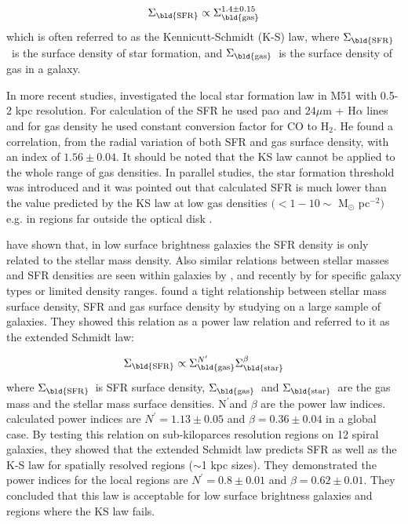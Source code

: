 \documentclass[useAMS,usenatbib]{mn2e}
\newcommand \sigmagas    {$\Sigma_{\rm \bld {gas }}$\ }
\newcommand \eqsigmagas    {\Sigma_{\rm \bld {gas }}}
\newcommand \sigmasfr     {$\Sigma_{\rm \bld {SFR }}$\ }
\newcommand \eqsigmasfr     {\Sigma_{\rm \bld {SFR }}}
\newcommand \sigmastar    {$\Sigma_{\rm \bld {star }}$\ }
\newcommand \eqsigmastar    {\Sigma_{\rm \bld {star }}}
\newcommand \nprime {N$^\prime$}
\newcommand \eqnprime {N^\prime}
\begin{document}
\begin{equation}
\label{equ:ks_org}
\eqsigmasfr \propto \eqsigmagas^{1.4\pm0.15}
\end{equation}
which is often referred to as the Kennicutt-Schmidt (K-S) law, where \sigmasfr is the surface density of star formation, and \sigmagas is the surface density of gas in a galaxy.


In more recent studies, \cite{Kennicutt08} investigated the local star formation law in M51 with 0.5-2 kpc resolution. For calculation of the SFR he used pa${\alpha}$ and $24\mu$m + H${\alpha}$ lines and for gas density he used constant conversion factor for CO to H$_2$. He found a correlation, from the radial variation of both SFR and gas surface density, with an index of $1.56 \pm 0.04$.
It should be noted that the KS law cannot be applied to the whole range of gas densities. In parallel studies, the star formation threshold was introduced and it was pointed out that calculated SFR is much lower than the value predicted by the KS law at low gas densities $( < 1-10\sim$ M$_{\odot}$ pc$^{-2})$ e.g. in regions far outside the optical disk \citep[e.g.,][]{Martin01, Bigiel08}.

\cite{Hunter98} have shown that, in low surface brightness galaxies the SFR density is only related to the stellar mass density. Also similar relations between stellar masses and SFR densities are seen within galaxies by \cite{Ryder94}, \cite{Hunter04} and recently by \cite{Leroy08} for specific galaxy types or limited density ranges. \cite{Shi11} found a tight relationship between stellar mass surface density, SFR and gas surface density by studying on a large sample of galaxies. They showed this relation as a power law relation and referred to it as the extended Schmidt law:

\begin{equation}
\label{equ:es_org}
\eqsigmasfr \propto \eqsigmagas^{\eqnprime} \eqsigmastar^{\beta}
\end{equation}
where \sigmasfr is SFR surface density, \sigmagas and \sigmastar are the gas mass and the stellar mass surface densities. \nprime and $\beta$ are the power law indices. \cite{Shi11} calculated power indices are $\eqnprime = 1.13 \pm 0.05$ and $\beta = 0.36\pm0.04$ in a global case. By testing this relation on sub-kiloparces resolution regions on 12 spiral galaxies, they showed that the extended Schmidt law predicts SFR as well as the K-S law for spatially resolved regions ($\sim$1 kpc sizes). They demonstrated the power indices for the local regions are $\eqnprime = 0.8 \pm 0.01$ and $\beta = 0.62\pm0.01$. They concluded that this law is acceptable for low surface brightness galaxies and regions where the KS law fails.
\end{document}
